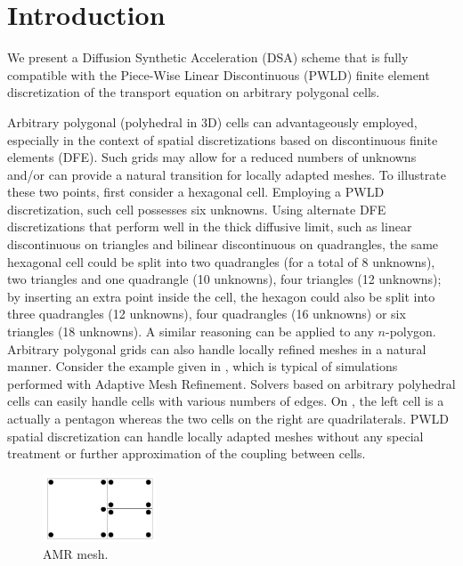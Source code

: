 \section{Introduction}

We present a Diffusion Synthetic Acceleration (DSA) scheme
that is fully compatible with the Piece-Wise Linear Discontinuous (PWLD) finite
element discretization of the transport equation on arbitrary
polygonal cells. 

Arbitrary polygonal (polyhedral in 3D) cells can advantageously employed, especially
in the context of spatial discretizations based on discontinuous finite elements (DFE).
Such grids may allow for a reduced numbers of unknowns and/or can provide a natural
transition for locally adapted meshes. To illustrate these two points, first consider
a hexagonal cell. Employing a PWLD discretization, such cell possesses six unknowns. Using
alternate DFE discretizations that perform well in the thick diffusive limit, such as 
linear discontinuous on triangles and bilinear discontinuous on quadrangles, the same 
hexagonal cell could be split into two quadrangles (for a total of 8 unknowns), two 
triangles and one quadrangle (10 unknowns), four triangles (12 unknowns); by inserting an 
extra point inside the cell, the hexagon could also be split into three quadrangles 
(12 unknowns), four quadrangles (16 unknowns) or six triangles (18 unknowns). A 
similar reasoning can be applied to any $n$-polygon. Arbitrary polygonal grids can 
also handle locally refined meshes in a natural manner. Consider the example given
in , which is typical of simulations performed with Adaptive Mesh 
Refinement. Solvers based on arbitrary polyhedral cells can easily handle cells 
with various numbers of edges. On , the left cell is a actually a
pentagon whereas the two cells on the right are quadrilaterals. PWLD spatial
discretization can handle locally adapted meshes without any special treatment 
or further approximation of the coupling between cells.
\begin{figure}[H]
   \centering
   \includegraphics[width=0.3\textwidth]{amr}
   \caption{AMR mesh.}
   \label{fig_amr}
\end{figure}



